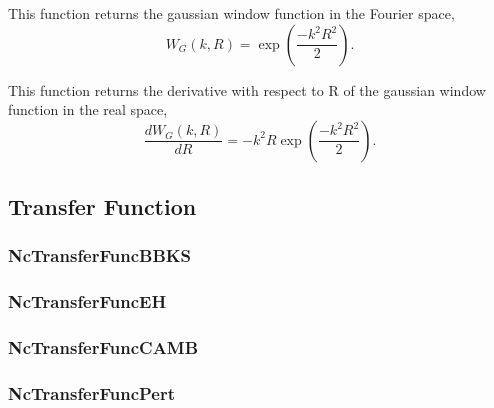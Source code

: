 \documentclass[a4paper,twocolumn]{article}
\begin{document}
This function returns the gaussian window function in the Fourier space,
\hypertarget{eq_gauss_fourier}{}
\begin{equation}
W_G(k, R) = \exp \left( \frac{-k^2 R^2}{2} \right).
\end{equation} 

This function returns the derivative with respect to R of the gaussian window function 
in the real space,
\hypertarget{eq_gauss_fourier_der}{}
\begin{equation}
\frac{dW_G(k, R)}{dR} = -k^2 R \exp \left( \frac{-k^2 R^2}{2} \right).  
\end{equation}

\subsection{Transfer Function}
\hypertarget{sec_transf}{}

\subsubsection{NcTransferFuncBBKS}

\subsubsection{NcTransferFuncEH}

\subsubsection{NcTransferFuncCAMB}

\subsubsection{NcTransferFuncPert}



\end{document}
